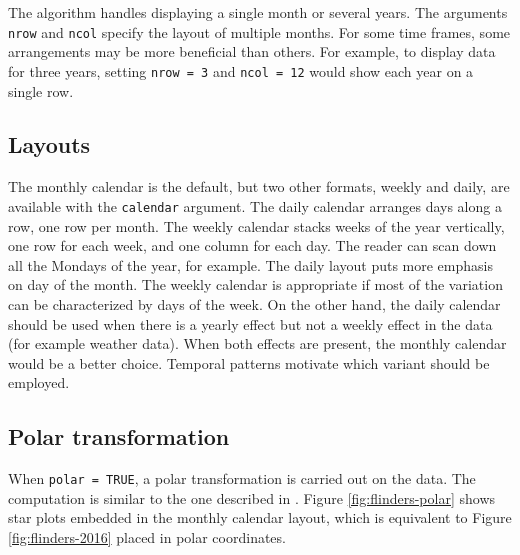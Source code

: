 \documentclass[12pt]{article}
\begin{document}
The algorithm handles displaying a single month or several years. The
arguments \texttt{nrow} and \texttt{ncol} specify the layout of multiple
months. For some time frames, some arrangements may be more beneficial
than others. For example, to display data for three years, setting
\texttt{nrow\ =\ 3} and \texttt{ncol\ =\ 12} would show each year on a
single row.

\hypertarget{layouts}{%
\subsection{Layouts}\label{layouts}}

The monthly calendar is the default, but two other formats, weekly and
daily, are available with the \texttt{calendar} argument. The daily
calendar arranges days along a row, one row per month. The weekly
calendar stacks weeks of the year vertically, one row for each week, and
one column for each day. The reader can scan down all the Mondays of the
year, for example. The daily layout puts more emphasis on day of the
month. The weekly calendar is appropriate if most of the variation can
be characterized by days of the week. On the other hand, the daily
calendar should be used when there is a yearly effect but not a weekly
effect in the data (for example weather data). When both effects are
present, the monthly calendar would be a better choice. Temporal
patterns motivate which variant should be employed.

\hypertarget{polar-transformation}{%
\subsection{Polar transformation}\label{polar-transformation}}

When \texttt{polar\ =\ TRUE}, a polar transformation is carried out on
the data. The computation is similar to the one described in
\citet{Wickham2012glyph}. Figure \ref{fig:flinders-polar} shows star
plots embedded in the monthly calendar layout, which is equivalent to
Figure \ref{fig:flinders-2016} placed in polar coordinates.
\end{document}
